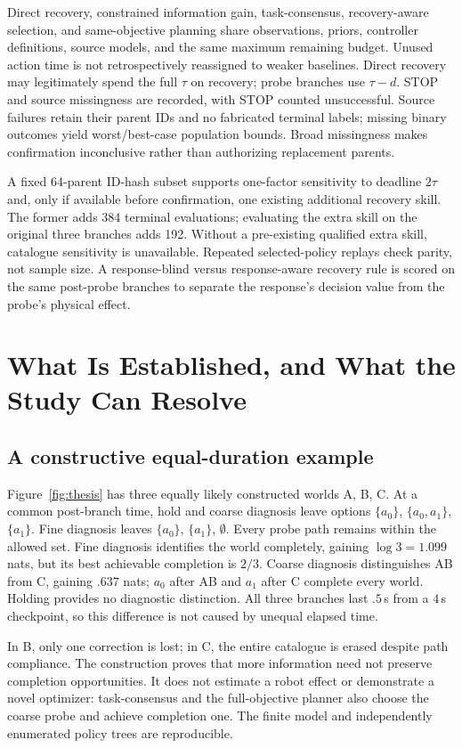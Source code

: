 \documentclass[conference]{IEEEtran}
\begin{document}
Direct recovery, constrained information gain, task-consensus, recovery-aware selection, and same-objective planning share observations, priors, controller definitions, source models, and the same maximum remaining budget. Unused action time is not retrospectively reassigned to weaker baselines. Direct recovery may legitimately spend the full $\tau$ on recovery; probe branches use $\tau-d$. STOP and source missingness are recorded, with STOP counted unsuccessful. Source failures retain their parent IDs and no fabricated terminal labels; missing binary outcomes yield worst/best-case population bounds. Broad missingness makes confirmation inconclusive rather than authorizing replacement parents.

A fixed 64-parent ID-hash subset supports one-factor sensitivity to deadline $2\tau$ and, only if available before confirmation, one existing additional recovery skill. The former adds 384 terminal evaluations; evaluating the extra skill on the original three branches adds 192. Without a pre-existing qualified extra skill, catalogue sensitivity is unavailable. Repeated selected-policy replays check parity, not sample size. A response-blind versus response-aware recovery rule is scored on the same post-probe branches to separate the response's decision value from the probe's physical effect.

\section{What Is Established, and What the Study Can Resolve}
\subsection{A constructive equal-duration example}
Figure~\ref{fig:thesis} has three equally likely constructed worlds A, B, C. At a common post-branch time, hold and coarse diagnosis leave options $\{a_0\}$, $\{a_0,a_1\}$, $\{a_1\}$. Fine diagnosis leaves $\{a_0\}$, $\{a_1\}$, $\emptyset$. Every probe path remains within the allowed set. Fine diagnosis identifies the world completely, gaining $\log3=1.099$ nats, but its best achievable completion is $2/3$. Coarse diagnosis distinguishes AB from C, gaining $.637$ nats; $a_0$ after AB and $a_1$ after C complete every world. Holding provides no diagnostic distinction. All three branches last $.5$\,s from a $4$\,s checkpoint, so this difference is not caused by unequal elapsed time.

In B, only one correction is lost; in C, the entire catalogue is erased despite path compliance. The construction proves that more information need not preserve completion opportunities. It does not estimate a robot effect or demonstrate a novel optimizer: task-consensus and the full-objective planner also choose the coarse probe and achieve completion one. The finite model and independently enumerated policy trees are reproducible.
\end{document}
